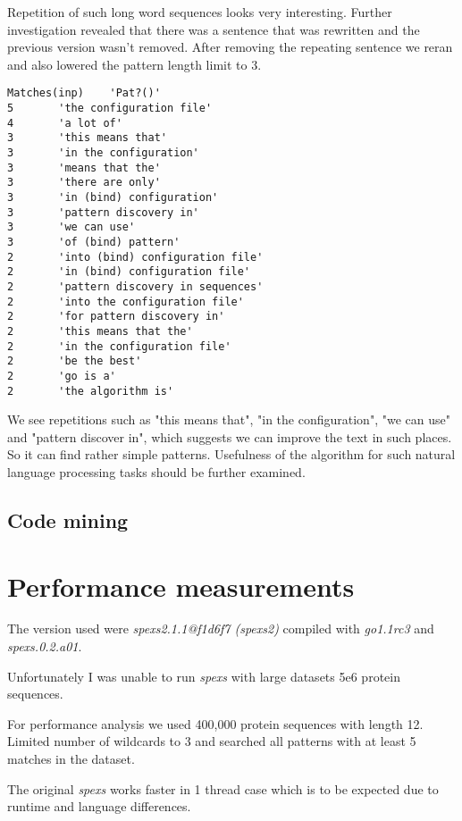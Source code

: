 Repetition of such long word sequences looks very interesting. Further investigation revealed that there was a sentence that was rewritten and the previous version wasn't removed. After removing the repeating sentence we reran and also lowered the pattern length limit to 3.

\begin{Verbatim}
Matches(inp)    'Pat?()'
5       'the configuration file'
4       'a lot of'
3       'this means that'
3       'in the configuration'
3       'means that the'
3       'there are only'
3       'in (bind) configuration'
3       'pattern discovery in'
3       'we can use'
3       'of (bind) pattern'
2       'into (bind) configuration file'
2       'in (bind) configuration file'
2       'pattern discovery in sequences'
2       'into the configuration file'
2       'for pattern discovery in'
2       'this means that the'
2       'in the configuration file'
2       'be the best'
2       'go is a'
2       'the algorithm is'
\end{Verbatim}

We see repetitions such as "this means that", "in the configuration", "we can use" and "pattern discover in", which suggests we can improve the text in such places. So it can find rather simple patterns. Usefulness of the algorithm for such natural language processing tasks should be further examined.

\subsection{Code mining}


\section{Performance measurements}

The version used were \emph{spexs2.1.1@f1d6f7 (spexs2)} compiled with \emph{go1.1rc3} and \emph{spexs.0.2.a01}.

Unfortunately I was unable to run \emph{spexs} with large datasets 5e6 protein sequences.

For performance analysis we used 400,000 protein sequences with length 12. Limited number of wildcards to 3 and searched all patterns with at least 5 matches in the dataset.

The original \emph{spexs} works faster in 1 thread case which is to be expected due to 
runtime and language differences. 